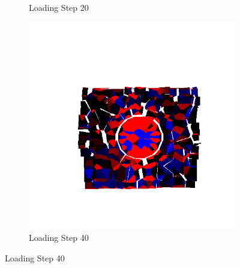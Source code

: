 \begin{figure}[ht!]
\begin{subfigure}{.33\textwidth}
      \caption{Loading Step 20}
      \end{subfigure}%
      \begin{subfigure}{.33\textwidth}
        \centering
        \includegraphics[width=1.0\linewidth]{Files/Small_ASR/IS2/DEP5-STEP(060).png}
        \caption{Loading Step 40}
      \end{subfigure}


\end{figure}
